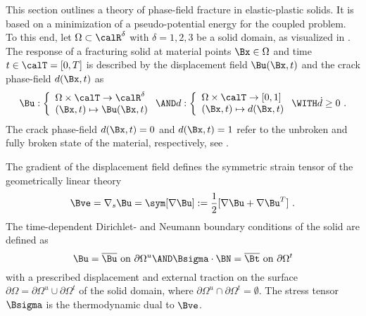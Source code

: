 \documentclass[final,3p,times]{elsarticle}
\begin{document}
This section outlines a theory of phase-field fracture in elastic-plastic solids. It is based on a minimization of a pseudo-potential energy for the coupled problem. To this end, let $\Omega\subset{\calR}^{\delta}$ with $\delta = 1,2,3$ be a solid domain, as visualized in . The response of a fracturing solid at material points $\Bx\in\Omega$ and time $t\in \calT = [0,T]$ is described by the displacement field $\Bu(\Bx,t)$ and the crack phase-field $d(\Bx,t)$ as
\begin{equation}
\Bu: 
\left\{
\begin{array}{ll}
 \Omega \times \calT \rightarrow \calR^{\delta} \\
 (\Bx, t)  \mapsto \Bu(\Bx,t)
\end{array}
\right.
\AND
d: 
\left\{
\begin{array}{ll}
 \Omega \times \calT \rightarrow [0,1] \\
 (\Bx, t)  \mapsto d(\Bx,t)
\end{array}
\right.
\WITH
\dot{d} \ge 0  \ .
\label{phi-d-fields}
\end{equation}
%
The crack phase-field $d(\Bx,t)=0$ and $d(\Bx,t)=1$ refer to the unbroken and fully broken state of the material, respectively, see .

The gradient of the displacement field defines the symmetric strain tensor of the geometrically linear theory
\begin{equation}
\Bve = \nabla_s \Bu = \sym[ \nabla \Bu ] := \frac{1}{2} [\nabla\Bu + \nabla\Bu^T]
\ .
\end{equation}
%
The time-dependent Dirichlet- and Neumann boundary conditions of the solid are defined as
\begin{equation}
\Bu = \overline{\Bu} \ \textrm{on}\ \partial\Omega^u
\AND
\Bsigma \cdot \BN 
= \overline{\Bt} \ \textrm{on}\ \partial\Omega^{t}
\end{equation}
with a prescribed displacement and external traction on the surface $\partial \Omega = \partial \Omega^u\cup \partial
\Omega^{t}$ of the solid domain, where $\partial \Omega^{u} \cap \partial \Omega^{t}     = \emptyset$. The stress tensor $\Bsigma$ is the thermodynamic dual to $\Bve$.
\end{document}
